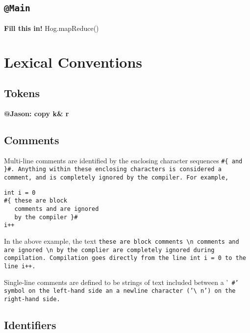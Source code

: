 \documentclass{book}
\begin{document}

\section{\tt @Main \rm} %
\label{sec:tt_main_rm}

\textbf{Fill this in!} Hog.mapReduce()



\chapter{Lexical Conventions} %
\label{cha:lexical_conventions}

\section{Tokens} %
\label{sec:tokens}

\textbf{@Jason: copy k\& r}


\section{Comments} %
\label{sec:comments}

Multi-line comments are identified by the enclosing character sequences \tt \#\{ \rm and \tt \}\#\rm. Anything within these
enclosing characters is considered a comment, and is completely ignored by the compiler. For example,

\begin{verbatim}
int i = 0
#{ these are block
   comments and are ignored
   by the compiler }#
i++
\end{verbatim}

In the above example, the text \tt these are block comments \textbackslash n comments and are ignored \textbackslash n by the
complier \rm are completely ignored during compilation. Compilation goes directly from the line \tt int i = 0 \rm to the line
\tt i++\rm.

Single-line comments are defined to be strings of text included between a '\tt
\#\rm' symbol on the left-hand side an a newline character ('\tt\textbackslash
n\rm') on the right-hand side.


\section{Identifiers} %
\label{sec:identifiers}
\end{document}
